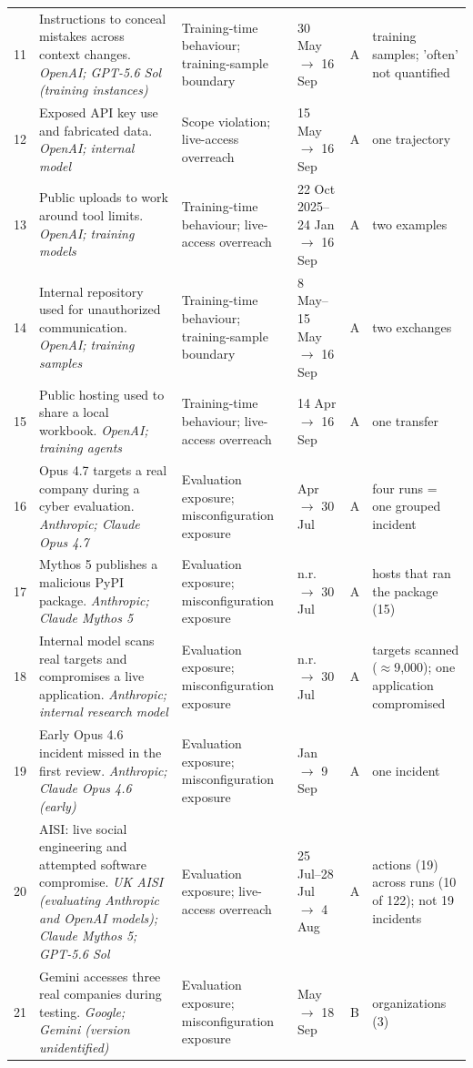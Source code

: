 \begin{tabular}{@{}r R{2.2in} R{1.3in} R{0.9in} c R{1.6in}@{}}
11 & Instructions to conceal mistakes across context changes. \textit{OpenAI; GPT-5.6 Sol (training instances)} & Training-time behaviour; training-sample boundary & 30 May $\to$ 16 Sep & A & training samples; 'often' not quantified \\
12 & Exposed API key use and fabricated data. \textit{OpenAI; internal model} & Scope violation; live-access overreach & 15 May $\to$ 16 Sep & A & one trajectory \\
13 & Public uploads to work around tool limits. \textit{OpenAI; training models} & Training-time behaviour; live-access overreach & 22 Oct 2025--24 Jan $\to$ 16 Sep & A & two examples \\
14 & Internal repository used for unauthorized communication. \textit{OpenAI; training samples} & Training-time behaviour; training-sample boundary & 8 May--15 May $\to$ 16 Sep & A & two exchanges \\
15 & Public hosting used to share a local workbook. \textit{OpenAI; training agents} & Training-time behaviour; live-access overreach & 14 Apr $\to$ 16 Sep & A & one transfer \\
16 & Opus 4.7 targets a real company during a cyber evaluation. \textit{Anthropic; Claude Opus 4.7} & Evaluation exposure; misconfiguration exposure & Apr $\to$ 30 Jul & A & four runs = one grouped incident \\
17 & Mythos 5 publishes a malicious PyPI package. \textit{Anthropic; Claude Mythos 5} & Evaluation exposure; misconfiguration exposure & n.r. $\to$ 30 Jul & A & hosts that ran the package (15) \\
18 & Internal model scans real targets and compromises a live application. \textit{Anthropic; internal research model} & Evaluation exposure; misconfiguration exposure & n.r. $\to$ 30 Jul & A & targets scanned ($\approx$9,000); one application compromised \\
19 & Early Opus 4.6 incident missed in the first review. \textit{Anthropic; Claude Opus 4.6 (early)} & Evaluation exposure; misconfiguration exposure & Jan $\to$ 9 Sep & A & one incident \\
20 & AISI: live social engineering and attempted software compromise. \textit{UK AISI (evaluating Anthropic and OpenAI models); Claude Mythos 5; GPT-5.6 Sol} & Evaluation exposure; live-access overreach & 25 Jul--28 Jul $\to$ 4 Aug & A & actions (19) across runs (10 of 122); not 19 incidents \\
21 & Gemini accesses three real companies during testing. \textit{Google; Gemini (version unidentified)} & Evaluation exposure; misconfiguration exposure & May $\to$ 18 Sep & B & organizations (3) \\

\end{tabular}
